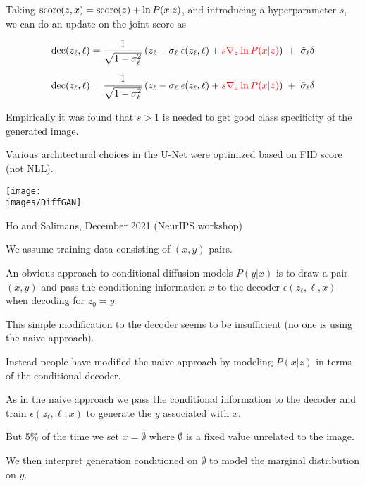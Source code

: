 {\vfill

\vfill
Taking $\mathrm{score}(z,x) = \mathrm{score}(z) + \ln P(x|z)$, and introducing a hyperparameter $s$, we can do an update on the joint score as


$$\mathrm{dec}(z_\ell,\ell) = \frac{1}{\sqrt{1-\sigma_\ell^2}}\left(z_\ell - \sigma_\ell\; \epsilon(z_\ell,\ell) + {\color{red} s \nabla_{z} \ln P(x|z)}\right)\; +\; \tilde{\sigma}_\ell\delta$$



$$\mathrm{dec}(z_\ell,\ell) = \frac{1}{\sqrt{1-\sigma_\ell^2}}\left(z_\ell - \sigma_\ell\; \epsilon(z_\ell,\ell) + {\color{red} s \nabla_{z} \ln P(x|z)}\right)\; +\; \tilde{\sigma}_\ell\delta$$

\vfill
Empirically it was found that $s > 1$ is needed to get good class specificity of the generated image.


Various architectural choices in the U-Net were optimized based on FID score (not NLL).


\centerline{\texttt{[image: \\images/DiffGAN]}}

{Ho and Salimans, December 2021 (NeurIPS workshop)}

We assume training data consisting of $(x,y)$ pairs.

\vfill
An obvious approach to conditional diffusion models $P(y|x)$ is to draw a pair $(x,y)$ and pass the conditioning information $x$ to the decoder
$\epsilon(z_\ell,\ell,x)$ when decoding for $z_0 = y$.

\vfill
This simple modification to the decoder seems to be insufficient (no one is using the naive approach).

\vfill
Instead people have modified the naive approach by modeling $P(x|z)$ in terms of the conditional decoder.


As in the naive approach we pass the conditional information to the decoder and train $\epsilon(z_\ell,\ell,x)$ to generate the $y$ associated with $x$.

\vfill
But 5\% of the time we set $x = \emptyset$ where $\emptyset$ is a fixed value unrelated to the image.

\vfill
We then interpret generation conditioned on $\emptyset$ to model the marginal distribution on $y$.

}
